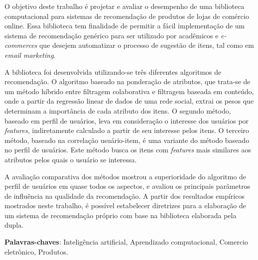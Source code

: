 \setlength{\absparsep}{18pt} %
\begin{resumo}
O objetivo deste trabalho é projetar e avaliar o desempenho de uma biblioteca computacional para sistemas de recomendação de produtos de lojas de comércio online. Essa biblioteca tem finalidade de permitir a fácil implementação de um sistema de recomendação genérico para ser utilizado por acadêmicos e \textit{e-commerces} que desejem automatizar o processo de sugestão de itens, tal como em \textit{email marketing}. 

A biblioteca foi desenvolvida utilizando-se três diferentes algoritmos de recomendação. O algoritmo baseado na ponderação de atributos, que trata-se de um método híbrido entre filtragem colaborativa e filtragem baseada em conteúdo, onde a partir da regressão linear de dados de uma rede social, extrai os pesos que determinam a importância de cada atributo dos itens. O segundo método, baseado em perfil de usuários, leva em consideração o interesse dos usuários por \textit{features}, indiretamente calculado a partir de seu interesse pelos itens. O terceiro método, baseado na correlação usuário-item, é uma variante do método baseado no perfil de usuários. Este método busca os itens com \textit{features} mais similares aos atributos pelos quais o usuário se interessa.

A avaliação comparativa dos métodos mostrou a superioridade do algoritmo de perfil de usuários em quase todos os aspectos, e avaliou os principais parâmetros de influência na qualidade da recomendação. A partir dos resultados empíricos mostrados neste trabalho, é possível estabelecer diretrizes para a elaboração de um sistema de recomendação próprio com base na biblioteca elaborada pela dupla.

\textbf{Palavras-chaves}: Inteligência artificial, Aprendizado computacional, Comercio eletrônico, Produtos.
\end{resumo}